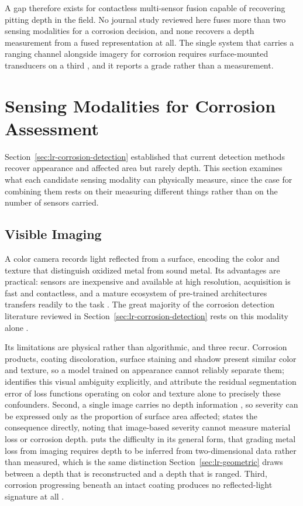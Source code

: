 A gap therefore exists for contactless multi-sensor fusion capable of recovering
pitting depth in the field. No journal study reviewed here fuses more than two
sensing modalities for a corrosion decision, and none recovers a depth
measurement from a fused representation at all. The single system that carries a
ranging channel alongside imagery for corrosion requires surface-mounted
transducers on a third \citep{Ding2025}, and it reports a grade rather than a
measurement.

\section{Sensing Modalities for Corrosion Assessment}
\label{sec:lr-modalities}

Section~\ref{sec:lr-corrosion-detection} established that current detection
methods recover appearance and affected area but rarely depth. This section examines what each
candidate sensing modality can physically measure, since the case for combining
them rests on their measuring different things rather than on the number of
sensors carried.

\subsection{Visible Imaging}

A color camera records light reflected from a surface, encoding the color and
texture that distinguish oxidized metal from sound metal. Its advantages are
practical: sensors are inexpensive and available at high resolution, acquisition
is fast and contactless, and a mature ecosystem of pre-trained architectures
transfers readily to the task \citep{Yao2019,Nash2022}. The great majority of the
corrosion detection literature reviewed in
Section~\ref{sec:lr-corrosion-detection} rests on this modality alone
\citep{Alvani2026,Imran2025,Yu2022}.

Its limitations are physical rather than algorithmic, and three recur.
Corrosion products, coating discoloration, surface staining and shadow present
similar color and texture, so a model trained on appearance cannot reliably
separate them; \citet{Lavadiya2022} identifies this visual ambiguity explicitly, and
\citet{Liu2026} attribute the residual segmentation error of loss functions
operating on color and texture alone to precisely these confounders. Second, a
single image carries no depth information \citep{Cheng2025}, so severity can be
expressed only as the proportion of surface area affected; \citet{Alvani2026} states
the consequence directly, noting that image-based severity cannot measure
material loss or corrosion depth. \citet{Egodawela2025} puts the difficulty in
its general form, that grading metal loss from imaging requires depth to be
inferred from two-dimensional data rather than measured, which is the same
distinction Section~\ref{sec:lr-geometric} draws between a depth that is
reconstructed and a depth that is ranged. Third, corrosion progressing beneath an intact
coating produces no reflected-light signature at all \citep{Lim2021}.

